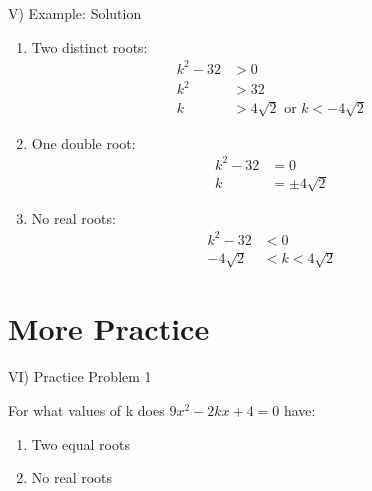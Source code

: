 \documentclass[aspectratio=169]{beamer}
\begin{document}
\begin{frame}{V) Example: Solution}
    \begin{tcolorbox}[colback=lightgray,colframe=accent,title=Solution]
        \footnotesize
        \begin{enumerate}
            \item Two distinct roots:
            \begin{align*}
                k^2-32 &> 0\\
                k^2 &> 32\\
                k &> 4\sqrt{2} \text{ or } k < -4\sqrt{2}
            \end{align*}
            
            \item One double root:
            \begin{align*}
                k^2-32 &= 0\\
                k &= \pm 4\sqrt{2}
            \end{align*}
            
            \item No real roots:
            \begin{align*}
                k^2-32 &< 0\\
                -4\sqrt{2} &< k < 4\sqrt{2}
            \end{align*}
        \end{enumerate}
    \end{tcolorbox}
\end{frame}

\section{More Practice}

\begin{frame}{VI) Practice Problem 1}
    \begin{tcolorbox}[colback=lightgray,colframe=primary,title=Problem]
        \footnotesize
        For what values of k does $9x^2-2kx+4=0$ have:
        \begin{enumerate}
            \item Two equal roots
            \item No real roots
        \end{enumerate}
    \end{tcolorbox}
\end{frame}
\end{document}
